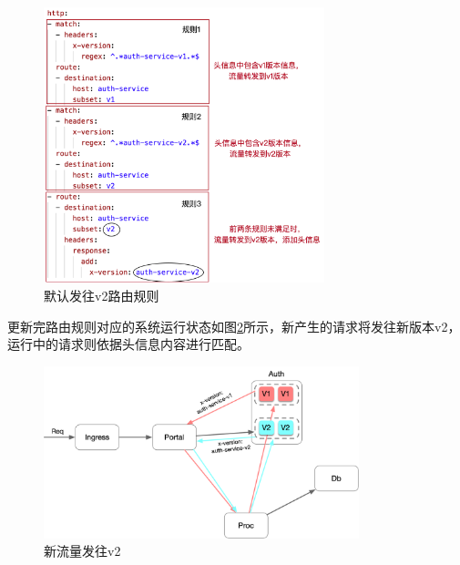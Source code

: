 \documentclass[12pt,a4paper]{article}
\theoremstyle{definition}
\begin{document}
\begin{figure}[ht]
 \centering
 \includegraphics[height=8cm]{images/vs_default_v2.png}
 \caption{默认发往v2路由规则}
 \label{fig:vs_default_v2}
\end{figure}

更新完路由规则对应的系统运行状态如图\ref{fig:traffic_v1v2}所示，新产生的请求将发往新版本v2，运行中的请求则依据头信息内容进行匹配。
\begin{figure}[ht]
 \centering
 \includegraphics[height=5cm]{images/traffic_v1v2.png}
 \caption{新流量发往v2}
 \label{fig:traffic_v1v2}
\end{figure}
\end{document}

